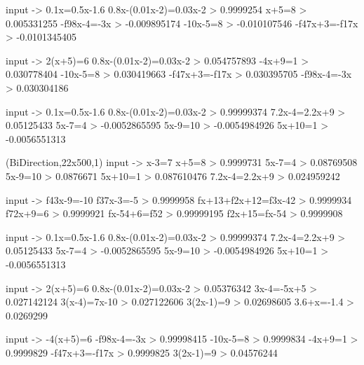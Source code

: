 input -> 0.1x=0.5x-1.6
0.8x-(0.01x-2)=0.03x-2 > 0.9999254
x+5=8 > 0.005331255
-f{9}{8}x-4=-3x > -0.009895174
-10x-5=8 > -0.010107546
-f{4}{7}x+3=-f{1}{7}x > -0.0101345405

input -> 2(x+5)=6
0.8x-(0.01x-2)=0.03x-2 > 0.054757893
-4x+9=1 > 0.030778404
-10x-5=8 > 0.030419663
-f{4}{7}x+3=-f{1}{7}x > 0.030395705
-f{9}{8}x-4=-3x > 0.030304186

input -> 0.1x=0.5x-1.6
0.8x-(0.01x-2)=0.03x-2 > 0.99999374
7.2x-4=2.2x+9 > 0.05125433
5x-7=4 > -0.0052865595
5x-9=10 > -0.0054984926
5x+10=1 > -0.0056551313

(BiDirection,22x500,1)
input -> x-3=7
x+5=8 > 0.9999731
5x-7=4 > 0.08769508
5x-9=10 > 0.0876671
5x+10=1 > 0.087610476
7.2x-4=2.2x+9 > 0.024959242

input -> f{4}{3}x-9=-10
f{3}{7}x-3=-5 > 0.9999958
f{x+1}{3}+f{2x+1}{2}=f{3x-4}{2} > 0.9999934
f{7}{2}x+9=6 > 0.9999921
f{x-5}{4}+6=f{5}{2} > 0.99999195
f{2x+1}{5}=f{x-5}{4} > 0.9999908

input -> 0.1x=0.5x-1.6
0.8x-(0.01x-2)=0.03x-2 > 0.99999374
7.2x-4=2.2x+9 > 0.05125433
5x-7=4 > -0.0052865595
5x-9=10 > -0.0054984926
5x+10=1 > -0.0056551313

input -> 2(x+5)=6
0.8x-(0.01x-2)=0.03x-2 > 0.05376342
3x-4=-5x+5 > 0.027142124
3(x-4)=7x-10 > 0.027122606
3(2x-1)=9 > 0.02698605
3.6+x=-1.4 > 0.0269299

input -> -4(x+5)=6
-f{9}{8}x-4=-3x > 0.99998415
-10x-5=8 > 0.9999834
-4x+9=1 > 0.9999829
-f{4}{7}x+3=-f{1}{7}x > 0.9999825
3(2x-1)=9 > 0.04576244

